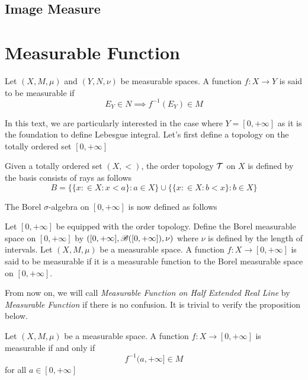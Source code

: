 \documentclass{report}
\begin{document}
\section{Image Measure}


\chapter{Measurable Function}

\begin{definition}
    Let $(X, M, \mu)$ and $(Y, N, \nu)$ be measurable spaces. A function $f: X \to Y$ is said to be measurable if 
    \[
        E_Y \in N \implies f^{-1}(E_Y) \in M
    \]
\end{definition}

In this text, we are particularly interested in the case where $Y = [0, +\infty]$ as it is the foundation to define Lebesgue integral. Let's first define a topology on the totally ordered set $[0, +\infty]$

\begin{definition}
    Given a totally ordered set $(X, <)$, the order topology $\mathcal{T}$ on $X$ is defined by the basis consists of rays as follows
    \[
    B = \{ \{x: \in X: x < a\}: a \in X\} \cup \{ \{x: \in X: b < x\}: b \in X\}
    \]
\end{definition}

The Borel $\sigma$-algebra on $[0, +\infty]$ is now defined as follows

\begin{definition}
    Let $[0, +\infty]$ be equipped with the order topology. Define the Borel measurable space on $[0, +\infty]$ by $([0, +\infty], \mathscr{B}([0, +\infty]), \nu)$ where $\nu$ is defined by the length of intervals.
    Let $(X, M, \mu)$ be a measurable space. A function $f: X \to [0, +\infty]$ is said to be measurable if it is a measurable function to the Borel measurable space on $[0, +\infty]$.
\end{definition}

From now on, we will call \textit{Measurable Function on Half Extended Real Line} by \textit{Measurable Function} if there is no confusion. It is trivial to verify the proposition below.

\begin{proposition}
    Let $(X, M, \mu)$ be a measurable space. A function $f: X \to [0, +\infty]$ is measurable if and only if 
    \[
        f^{-1}(a, +\infty] \in M
    \]
    for all $a \in [0, +\infty]$
\end{proposition}
\end{document}
